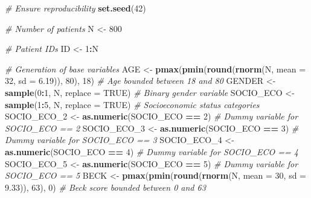 \documentclass[
]{book}
\newenvironment{Shaded}{\begin{snugshade}}{\end{snugshade}}
\newcommand{\AttributeTok}[1]{\textcolor[rgb]{0.13,0.29,0.53}{#1}}
\newcommand{\CommentTok}[1]{\textcolor[rgb]{0.56,0.35,0.01}{\textit{#1}}}
\newcommand{\ConstantTok}[1]{\textcolor[rgb]{0.56,0.35,0.01}{#1}}
\newcommand{\DecValTok}[1]{\textcolor[rgb]{0.00,0.00,0.81}{#1}}
\newcommand{\FloatTok}[1]{\textcolor[rgb]{0.00,0.00,0.81}{#1}}
\newcommand{\FunctionTok}[1]{\textcolor[rgb]{0.13,0.29,0.53}{\textbf{#1}}}
\newcommand{\NormalTok}[1]{#1}
\newcommand{\OtherTok}[1]{\textcolor[rgb]{0.56,0.35,0.01}{#1}}
\newcommand{\SpecialCharTok}[1]{\textcolor[rgb]{0.81,0.36,0.00}{\textbf{#1}}}
\begin{document}
\begin{Shaded}
\begin{Highlighting}[]
\CommentTok{\# Ensure reproducibility}
\FunctionTok{set.seed}\NormalTok{(}\DecValTok{42}\NormalTok{)  }

\CommentTok{\# Number of patients}
\NormalTok{N }\OtherTok{\textless{}{-}} \DecValTok{800}

\CommentTok{\# Patient IDs}
\NormalTok{ID }\OtherTok{\textless{}{-}} \DecValTok{1}\SpecialCharTok{:}\NormalTok{N}

\CommentTok{\# Generation of base variables}
\NormalTok{AGE }\OtherTok{\textless{}{-}} \FunctionTok{pmax}\NormalTok{(}\FunctionTok{pmin}\NormalTok{(}\FunctionTok{round}\NormalTok{(}\FunctionTok{rnorm}\NormalTok{(N, }\AttributeTok{mean =} \DecValTok{32}\NormalTok{, }\AttributeTok{sd =} \FloatTok{6.19}\NormalTok{)), }\DecValTok{80}\NormalTok{), }\DecValTok{18}\NormalTok{)  }\CommentTok{\# Age bounded between 18 and 80}
\NormalTok{GENDER }\OtherTok{\textless{}{-}} \FunctionTok{sample}\NormalTok{(}\DecValTok{0}\SpecialCharTok{:}\DecValTok{1}\NormalTok{, N, }\AttributeTok{replace =} \ConstantTok{TRUE}\NormalTok{)  }\CommentTok{\# Binary gender variable}
\NormalTok{SOCIO\_ECO }\OtherTok{\textless{}{-}} \FunctionTok{sample}\NormalTok{(}\DecValTok{1}\SpecialCharTok{:}\DecValTok{5}\NormalTok{, N, }\AttributeTok{replace =} \ConstantTok{TRUE}\NormalTok{)  }\CommentTok{\# Socioeconomic status categories}
\NormalTok{SOCIO\_ECO\_2 }\OtherTok{\textless{}{-}} \FunctionTok{as.numeric}\NormalTok{(SOCIO\_ECO }\SpecialCharTok{==} \DecValTok{2}\NormalTok{)  }\CommentTok{\# Dummy variable for SOCIO\_ECO == 2}
\NormalTok{SOCIO\_ECO\_3 }\OtherTok{\textless{}{-}} \FunctionTok{as.numeric}\NormalTok{(SOCIO\_ECO }\SpecialCharTok{==} \DecValTok{3}\NormalTok{)  }\CommentTok{\# Dummy variable for SOCIO\_ECO == 3}
\NormalTok{SOCIO\_ECO\_4 }\OtherTok{\textless{}{-}} \FunctionTok{as.numeric}\NormalTok{(SOCIO\_ECO }\SpecialCharTok{==} \DecValTok{4}\NormalTok{)  }\CommentTok{\# Dummy variable for SOCIO\_ECO == 4}
\NormalTok{SOCIO\_ECO\_5 }\OtherTok{\textless{}{-}} \FunctionTok{as.numeric}\NormalTok{(SOCIO\_ECO }\SpecialCharTok{==} \DecValTok{5}\NormalTok{)  }\CommentTok{\# Dummy variable for SOCIO\_ECO == 5}
\NormalTok{BECK }\OtherTok{\textless{}{-}} \FunctionTok{pmax}\NormalTok{(}\FunctionTok{pmin}\NormalTok{(}\FunctionTok{round}\NormalTok{(}\FunctionTok{rnorm}\NormalTok{(N, }\AttributeTok{mean =} \DecValTok{30}\NormalTok{, }\AttributeTok{sd =} \FloatTok{9.33}\NormalTok{)), }\DecValTok{63}\NormalTok{), }\DecValTok{0}\NormalTok{)  }\CommentTok{\# Beck score bounded between 0 and 63}


\end{Highlighting}
\end{Shaded}
\end{document}
